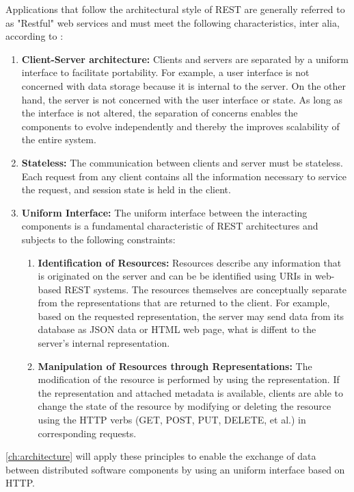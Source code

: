 Applications that follow the architectural style of REST are generally referred to as "Restful" web services and must meet
the following characteristics, inter alia, according to \cite{Field00}:
\begin{enumerate}
    \item \textbf{Client-Server architecture:}
    Clients and servers are separated by a uniform interface to facilitate portability. For example, a user interface
    is not concerned with data storage because it is internal to the server. On the other hand, the server is not concerned
    with the user interface or state. As long as the interface is not altered, the separation of concerns enables the
    components to evolve independently and thereby the improves scalability of the entire system.
    \item \textbf{Stateless:}
    The communication between clients and server must be stateless. Each request from any client contains all the
    information necessary to service the request, and session state is held in the client.
    \item \textbf{Uniform Interface:}
    The uniform interface between the interacting components is a fundamental characteristic of REST architectures and subjects
    to the following constraints:
    \begin{enumerate}
        \item \textbf{Identification of Resources:}
        Resources describe any information that is originated on the server and can be be identified using URIs in web-based
        REST systems. The resources themselves are conceptually separate from the representations that are returned to the client.
        For example, based on the requested representation, the server may send data from its database as JSON data or HTML web
        page, what is diffent to the server's internal representation.
        \item \textbf{Manipulation of Resources through Representations:}
        The modification of the resource is performed by using the representation. If the representation and attached metadata
        is available, clients are able to change the state of the resource by modifying or deleting the resource using the
        HTTP verbs (GET, POST, PUT, DELETE, et al.) in corresponding requests.
    \end{enumerate}
\end{enumerate}

\autoref{ch:architecture} will apply these principles to enable the exchange of data between distributed
software components by using an uniform interface based on HTTP.

